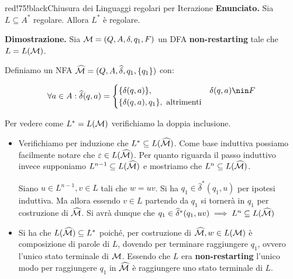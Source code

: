\begin{halfframedbox}{red!75!black}{Chiusura dei Linguaggi regolari per Iterazione}\label{Regolarità dell'iterazione}
  \textbf{Enunciato. } Sia \(L \subseteq A^*\) regolare. Allora \(L^*\) è regolare.

  \begin{center}
    \textcolor{red!75!black}{\hdashrule[0.5ex]{18cm}{1pt}{3mm 3pt 1mm 2pt}}
  \end{center}

  \textbf{Dimostrazione. } Sia \(\mathcal{M}=(Q,A,\delta,q_1,F)\) un DFA \textbf{non-restarting} tale che \(L=L(\mathcal{M})\).

  Definiamo un NFA \(\widehat{\mathcal{M}}=(Q, A, \widehat{\delta}, q_1, \displaystyle{\left\{{q_1}\right\}})\) con:

  \begin{equation}
      \forall a \in A: \widehat{\delta}(q,a)=\begin{cases}
        \cbrakets{\delta(q,a)}, & \delta(q,a) \nin F\\
        \cbrakets{\delta(q,a), q_1}, \text{ altrimenti}
      \end{cases}
  \end{equation}

  Per vedere come \(L^*=L(\mathcal{M})\) verifichiamo la doppia inclusione.

  \begin{itemize}
    \item [``\(\subseteq\)''] Verifichiamo per induzione che \(L^*\subseteq L(\widehat{\mathcal{M}})\). Come base induttiva possiamo facilmente notare che \(\varepsilon \in L(\widehat{\mathcal{M}})\).
    Per quanto riguarda il passo induttivo invece supponiamo \(L^{n-1}\subseteq L(\widehat{\mathcal{M}})\) e mostriamo che \(L^n \subseteq L(\widehat{\mathcal{M}})\).

    Siano \(u \in L^{n-1}, v \in L\) tali che \(w=uv\). Si ha \(q_1 \in \widehat{\delta}^*(q_1,u)\) per ipotesi induttiva. Ma allora essendo \(v \in L\) partendo da \(q_1\) si tornerà in \(q_1\) per costruzione di \(\widehat{\mathcal{M}}\). Si avrà dunque che \(q_1 \in \widehat{\delta}^*(q_1,uv) \implies L^n \subseteq L(\widehat{\mathcal{M}})\)

    \item [``\(\supseteq\)''] Si ha che \(L(\widehat{\mathcal{M}}) \subseteq L^*\) poiché, per costruzione di \(\widehat{\mathcal{M}}, w \in L(\mathcal{M})\) è composizione di parole di \(L\), dovendo per terminare raggiungere \(q_1\), ovvero l'unico stato terminale di \(\mathcal{M}\). Essendo che \(L\) era \textbf{non-restarting} l'unico modo per raggiungere \(q_1\) in \(\widehat{\mathcal{M}}\) è raggiungere uno stato terminale di \(L\).
  \end{itemize}

\end{halfframedbox}


